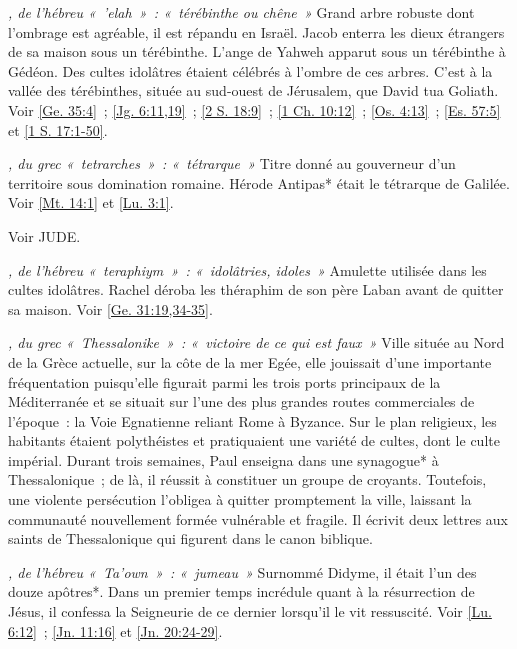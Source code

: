 \begin{multicols}{2}
\textit{, de l'hébreu «~'elah~»~: «~térébinthe ou chêne~»}\newline
Grand arbre robuste dont l'ombrage est agréable, il est répandu en Israël. Jacob enterra les dieux étrangers de sa maison sous un térébinthe. L'ange de Yahweh apparut sous un térébinthe à Gédéon. Des cultes idolâtres étaient célébrés à l'ombre de ces arbres. C'est à la vallée des térébinthes, située au sud-ouest de Jérusalem, que David tua Goliath.\newline
Voir \vref{Ge. 35:4}~; \vref{Jg. 6:11,19}~; \vref{2 S. 18:9}~; \vref{1 Ch. 10:12}~; \vref{Os. 4:13}~; \vref{Es. 57:5} et \vref{1 S. 17:1-50}.

\textit{, du grec «~tetrarches~»~: «~tétrarque~»}\newline
Titre donné au gouverneur d'un territoire sous domination romaine. Hérode Antipas* était le tétrarque de Galilée. Voir \vref{Mt. 14:1} et \vref{Lu. 3:1}.

\textit{}\newline
Voir JUDE.

\textit{, de l'hébreu «~teraphiym~»~: «~idolâtries, idoles~»}\newline
Amulette utilisée dans les cultes idolâtres. Rachel déroba les théraphim de son père Laban avant de quitter sa maison. Voir \vref{Ge. 31:19,34-35}.

\textit{, du grec «~Thessalonike~»~: «~victoire de ce qui est faux~»}\newline
Ville située au Nord de la Grèce actuelle, sur la côte de la mer Egée, elle jouissait d'une importante fréquentation puisqu'elle figurait parmi les trois ports principaux de la Méditerranée et se situait sur l'une des plus grandes routes commerciales de l'époque~: la Voie Egnatienne reliant Rome à Byzance. Sur le plan religieux, les habitants étaient polythéistes et pratiquaient une variété de cultes, dont le culte impérial. Durant trois semaines, Paul enseigna dans une synagogue* à Thessalonique~; de là, il réussit à constituer un groupe de croyants. Toutefois, une violente persécution l'obligea à quitter promptement la ville, laissant la communauté nouvellement formée vulnérable et fragile. Il écrivit deux lettres aux saints de Thessalonique qui figurent dans le canon biblique.

\textit{, de l'hébreu «~Ta'own~»~: «~jumeau~»}\newline
Surnommé Didyme, il était l'un des douze apôtres*. Dans un premier temps incrédule quant à la résurrection de Jésus, il confessa la Seigneurie de ce dernier lorsqu'il le vit ressuscité. Voir \vref{Lu. 6:12}~; \vref{Jn. 11:16} et \vref{Jn. 20:24-29}.


\end{multicols}
